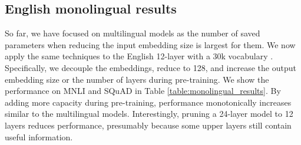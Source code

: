 \documentclass{article} \usepackage{iclr2021_conference,times}
\begin{document}
\begin{table*}
\caption{Effect of reducing the embedding size  for monolingual vs. multilingual models on MNLI and XNLI performance respectively. Monolingual numbers are from~\citet{Lan2020} and have vocabulary size of 30k.}
\label{table:monolingual_vs_multilingual}
\begin{center}
\end{center}
\end{table*}

\subsection{English monolingual results} \label{app:english_results}

So far, we have focused on multilingual models as the number of saved parameters when reducing the input embedding size is largest for them. We now apply the same techniques to the English 12-layer  with a 30k vocabulary \citep{Devlin2019}. Specifically, we decouple the embeddings, reduce  to 128, and increase the output embedding size or the number of layers during pre-training. We show the performance on MNLI \citep{Williams2018multinli} and SQuAD \citep{Rajpurkar2016squad} in Table \ref{table:monolingual_results}. By adding more capacity during pre-training, performance monotonically increases similar to the multilingual models. Interestingly, pruning a 24-layer model to 12 layers reduces performance, presumably because some upper layers still contain useful information.
\end{document}
